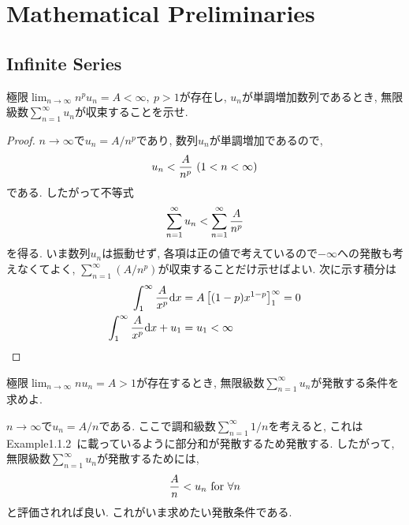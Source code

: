 \chapter{Mathematical Preliminaries} %
\label{cha:Mathematical Preliminaries}
\section{Infinite Series} %
\label{sec:Infinite Series}
\begin{qparts}
    \qpart
        \begin{qlist}
            \qitem 極限$\displaystyle\lim_{n\to\infty}n^pu_n = A < \infty ,\ p>1$が存在し, $u_n$が単調増加数列であるとき, 無限級数$\displaystyle\sum_{n=1}^{\infty}u_n$が収束することを示せ. 
            \begin{proof}
                $n\to\infty$で$u_n=A/n^p$であり, 数列$u_n$が単調増加であるので, 
                \begin{equation}
                    u_n<\frac{A}{n^p}\ (1<n<\infty) \notag
                \end{equation}
                である. したがって不等式
                \begin{equation}
                    \sum_{n=1}^{\infty}u_n < \sum_{n=1}^{\infty}\frac{A}{n^p} \notag
                \end{equation}
                を得る. いま数列$u_n$は振動せず, 各項は正の値で考えているので$-\infty$への発散も考えなくてよく, $\displaystyle\sum_{n=1}^{\infty}(A/n^p)$が収束することだけ示せばよい. 次に示す積分は
                \begin{align}
                    \int_1^{\infty}\frac{A}{x^p}\mathrm{d}x &= A\left[(1-p)x^{1-p}\right]_1^{\infty} = 0 \notag \\
                    \int_1^{\infty}\frac{A}{x^p}\mathrm{d}x + u_1 &= u_1 < \infty \notag
                \end{align}
            \end{proof}

            \qitem 極限$\displaystyle\lim_{n\to\infty}nu_n = A > 1$が存在するとき, 無限級数$\displaystyle\sum_{n=1}^{\infty}u_n$が発散する条件を求めよ. 

            $n\to\infty$で$u_n=A/n$である. ここで調和級数$\displaystyle\sum_{n=1}^{\infty}1/n$を考えると, これはExample1.1.2~\cite{MMfP}に載っているように部分和が発散するため発散する. したがって, 無限級数$\displaystyle\sum_{n=1}^{\infty}u_n$が発散するためには, 
            \begin{equation}
                \frac{A}{n} < u_n\ \text{for}\ \forall n \notag
            \end{equation}
            と評価されれば良い. これがいま求めたい発散条件である. 
        \end{qlist}


\end{qparts}
